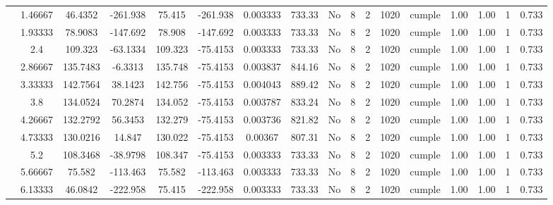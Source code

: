 \begin{table}[H]
{\begin{tabular}{|c|c|c|c|c|c|c|c|c|c|c|c|c|c|c|c|c|}
\cline{2-17}        & 1.46667 & 46.4352 & -261.938 & 75.415 & -261.938 & 0.003333 & 733.33 & No  & 8   & 2   & 1020 & \cellcolor[rgb]{ .776,  .937,  .808}cumple & 1.00 & 1.00 & 1   & 0.733 \bigstrut\\
\cline{2-17}        & 1.93333 & 78.9083 & -147.692 & 78.908 & -147.692 & 0.003333 & 733.33 & No  & 8   & 2   & 1020 & \cellcolor[rgb]{ .776,  .937,  .808}cumple & 1.00 & 1.00 & 1   & 0.733 \bigstrut\\
\cline{2-17}        & 2.4 & 109.323 & -63.1334 & 109.323 & -75.4153 & 0.003333 & 733.33 & No  & 8   & 2   & 1020 & \cellcolor[rgb]{ .776,  .937,  .808}cumple & 1.00 & 1.00 & 1   & 0.733 \bigstrut\\
\cline{2-17}        & 2.86667 & 135.7483 & -6.3313 & 135.748 & -75.4153 & 0.003837 & 844.16 & No  & 8   & 2   & 1020 & \cellcolor[rgb]{ .776,  .937,  .808}cumple & 1.00 & 1.00 & 1   & 0.733 \bigstrut\\
\cline{2-17}        & 3.33333 & 142.7564 & 38.1423 & 142.756 & -75.4153 & 0.004043 & 889.42 & No  & 8   & 2   & 1020 & \cellcolor[rgb]{ .776,  .937,  .808}cumple & 1.00 & 1.00 & 1   & 0.733 \bigstrut\\
\cline{2-17}        & 3.8 & 134.0524 & 70.2874 & 134.052 & -75.4153 & 0.003787 & 833.24 & No  & 8   & 2   & 1020 & \cellcolor[rgb]{ .776,  .937,  .808}cumple & 1.00 & 1.00 & 1   & 0.733 \bigstrut\\
\cline{2-17}        & 4.26667 & 132.2792 & 56.3453 & 132.279 & -75.4153 & 0.003736 & 821.82 & No  & 8   & 2   & 1020 & \cellcolor[rgb]{ .776,  .937,  .808}cumple & 1.00 & 1.00 & 1   & 0.733 \bigstrut\\
\cline{2-17}        & 4.73333 & 130.0216 & 14.847 & 130.022 & -75.4153 & 0.00367 & 807.31 & No  & 8   & 2   & 1020 & \cellcolor[rgb]{ .776,  .937,  .808}cumple & 1.00 & 1.00 & 1   & 0.733 \bigstrut\\
\cline{2-17}        & 5.2 & 108.3468 & -38.9798 & 108.347 & -75.4153 & 0.003333 & 733.33 & No  & 8   & 2   & 1020 & \cellcolor[rgb]{ .776,  .937,  .808}cumple & 1.00 & 1.00 & 1   & 0.733 \bigstrut\\
\cline{2-17}        & 5.66667 & 75.582 & -113.463 & 75.582 & -113.463 & 0.003333 & 733.33 & No  & 8   & 2   & 1020 & \cellcolor[rgb]{ .776,  .937,  .808}cumple & 1.00 & 1.00 & 1   & 0.733 \bigstrut\\
\cline{2-17}        & 6.13333 & 46.0842 & -222.958 & 75.415 & -222.958 & 0.003333 & 733.33 & No  & 8   & 2   & 1020 & \cellcolor[rgb]{ .776,  .937,  .808}cumple & 1.00 & 1.00 & 1   & 0.733 \bigstrut\\

\end{tabular}}
\end{table}
